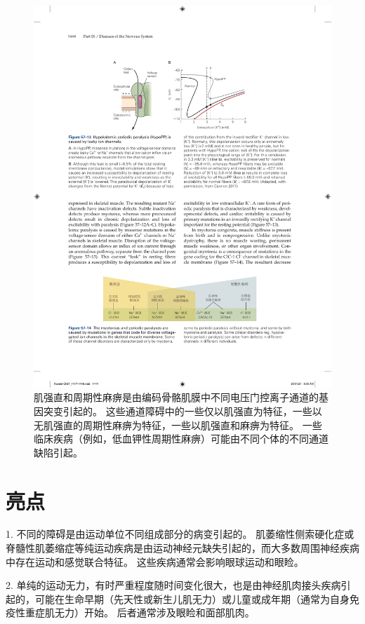 \begin{figure}[htbp]
	\centering
	\includegraphics[width=0.87\linewidth]{chap57/fig_57_14}
	\caption{肌强直和周期性麻痹是由编码骨骼肌膜中不同电压门控离子通道的基因突变引起的。
		这些通道障碍中的一些仅以肌强直为特征，一些以无肌强直的周期性麻痹为特征，一些以肌强直和麻痹为特征。
		一些临床疾病（例如，低血钾性周期性麻痹）可能由不同个体的不同通道缺陷引起。}
	\label{fig:57_14}
\end{figure}



\section{亮点}

1. 不同的障碍是由运动单位不同组成部分的病变引起的。
肌萎缩性侧索硬化症或脊髓性肌萎缩症等纯运动疾病是由运动神经元缺失引起的，而大多数周围神经疾病中存在运动和感觉联合特征。
这些疾病通常会影响眼球运动和眼睑。


2. 单纯的运动无力，有时严重程度随时间变化很大，也是由神经肌肉接头疾病引起的，可能在生命早期（先天性或新生儿肌无力）或儿童或成年期（通常为自身免疫性重症肌无力）开始。
后者通常涉及眼睑和面部肌肉。


